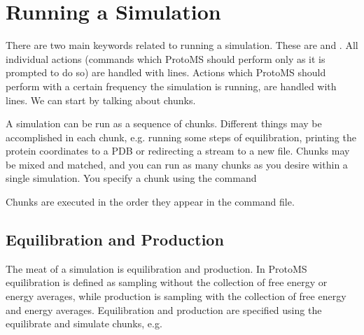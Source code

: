 \documentclass[letterpaper,10pt,english]{sphinxmanual}
\begin{document}
\section{Running a Simulation}
\label{\detokenize{protoms:running-a-simulation}}\label{\detokenize{protoms:runcmd}}
\ignorespaces 
There are two main keywords related to running a simulation. These are  and . All individual actions (commands which ProtoMS should perform only as it is prompted to do so) are handled with  lines. Actions which ProtoMS should perform with a certain frequency  the simulation is running, are handled with  lines. We can start by talking about chunks.

A simulation can be run as a sequence of chunks. Different things may be accomplished in each chunk, e.g. running some steps of equilibration, printing the protein coordinates to a PDB or redirecting a stream to a new file. Chunks may be mixed and matched, and you can run as many chunks as you desire within a single simulation. You specify a chunk using the command

%
\begin{sphinxVerbatim}[commandchars=\\\{\}]
 
\end{sphinxVerbatim}

Chunks are executed in the order they appear in the command file.


\subsection{Equilibration and Production}
\label{\detokenize{protoms:equilibration-and-production}}
The meat of a simulation is equilibration and production. In ProtoMS equilibration is defined as sampling without the collection of free energy or energy averages, while production is sampling with the collection of free energy and energy averages. Equilibration and production are specified using the equilibrate and simulate chunks, e.g.

\ignorespaces 
\def\sphinxLiteralBlockLabel{\label{\detokenize{protoms:index-68}}}
%
\begin{sphinxVerbatim}[commandchars=\\\{\}]
  
\end{sphinxVerbatim}
\end{document}
